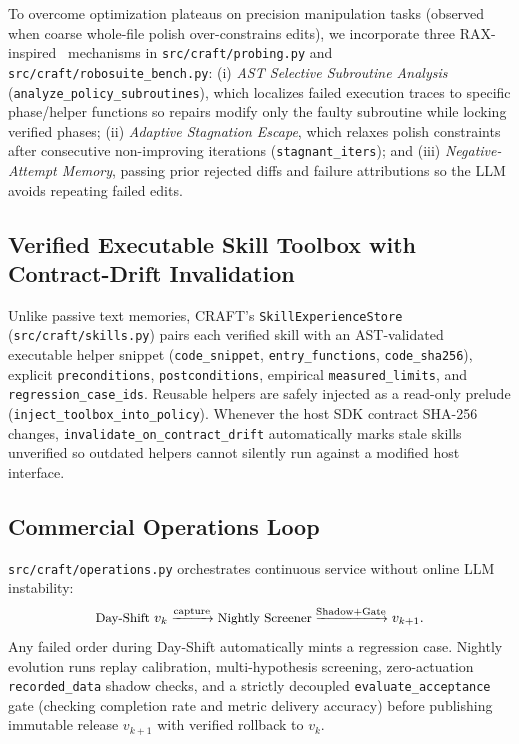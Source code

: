 \documentclass[10pt,journal]{IEEEtran}
\begin{document}
To overcome optimization plateaus on precision manipulation tasks (observed when coarse whole-file polish over-constrains edits), we incorporate three RAX-inspired~\cite{huang2026rax} mechanisms in \texttt{src/craft/probing.py} and \texttt{src/craft/robosuite\_bench.py}: (i) \emph{AST Selective Subroutine Analysis} (\texttt{analyze\_policy\_subroutines}), which localizes failed execution traces to specific phase/helper functions so repairs modify only the faulty subroutine while locking verified phases; (ii) \emph{Adaptive Stagnation Escape}, which relaxes polish constraints after consecutive non-improving iterations (\texttt{stagnant\_iters}); and (iii) \emph{Negative-Attempt Memory}, passing prior rejected diffs and failure attributions so the LLM avoids repeating failed edits.

\subsection{Verified Executable Skill Toolbox with Contract-Drift Invalidation}
Unlike passive text memories, CRAFT's \texttt{SkillExperienceStore} (\texttt{src/craft/skills.py}) pairs each verified skill with an AST-validated executable helper snippet (\texttt{code\_snippet}, \texttt{entry\_functions}, \texttt{code\_sha256}), explicit \texttt{preconditions}, \texttt{postconditions}, empirical \texttt{measured\_limits}, and \texttt{regression\_case\_ids}. Reusable helpers are safely injected as a read-only prelude (\texttt{inject\_toolbox\_into\_policy}). Whenever the host SDK contract SHA-256 changes, \texttt{invalidate\_on\_contract\_drift} automatically marks stale skills unverified so outdated helpers cannot silently run against a modified host interface.

\subsection{Commercial Operations Loop}
\texttt{src/craft/operations.py} orchestrates continuous service without online LLM instability:
\begin{equation}
{\small \text{Day-Shift } v_k \xrightarrow{\text{capture}} \text{Nightly Screener} \xrightarrow{\text{Shadow+Gate}} v_{k+1}.}
\end{equation}
Any failed order during Day-Shift automatically mints a regression case. Nightly evolution runs replay calibration, multi-hypothesis screening, zero-actuation \texttt{recorded\_data} shadow checks, and a strictly decoupled \texttt{evaluate\_acceptance} gate (checking completion rate and metric delivery accuracy) before publishing immutable release $v_{k+1}$ with verified rollback to $v_k$.
\end{document}
